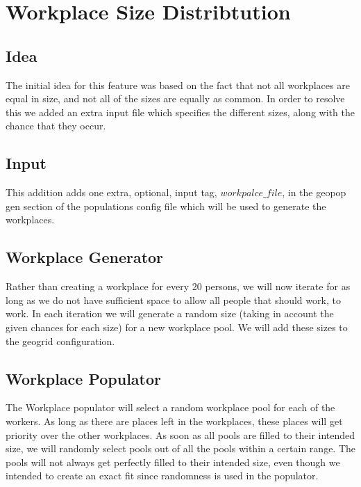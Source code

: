 
\section{Workplace Size Distribtution}
\label{section:WorkplaceSizeDistribution}

\subsection{Idea}
The initial idea for this feature was based on the fact that not all workplaces are equal in size, and not all of the sizes are equally as common. In order to resolve this we added an extra input file which specifies the different sizes, along with the chance that they occur.

\subsection{Input}
This addition adds one extra, optional, input tag, $workpalce\_file$, in the geopop gen section of the populations config file which will be used to generate the workplaces.

\subsection{Workplace Generator}
Rather than creating a workplace for every 20 persons, we will now iterate for as long as we do not have sufficient space to allow all people that should work, to work. In each iteration we will generate a random size (taking in account the given chances for each size) for a new workplace pool. We will add these sizes to the geogrid configuration.

\subsection{Workplace Populator}
The Workplace populator will select a random workplace pool for each of the workers. As long as there are places left in the workplaces, these places will get priority over the other workplaces. As soon as all pools are filled to their intended size, we will randomly select pools out of all the pools within a certain range. The pools will not always get perfectly filled to their intended size, even though we intended to create an exact fit since randomness is used in the populator.


